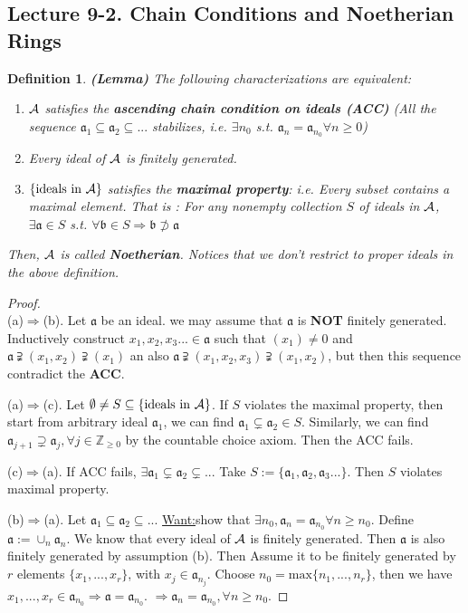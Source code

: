 \documentclass[11pt]{article}
\newtheorem{dfn}[thm]{Definition}
\newcommand{\intg}{\mathbb Z}
\newcommand{\sca}{{\mathfrak a}}
\newcommand{\scb}{{\mathfrak b}}
\newcommand{\cala}{{\cal A}}
\newcommand{\Lrta}{\Longrightarrow}
\begin{document}
\subsection{Lecture 9-2. Chain Conditions and Noetherian Rings}
\begin{dfn}
\textbf{(Lemma)} The following characterizations are equivalent:
\begin{enumerate}[label=(\alph*)]
\item $\cala$ satisfies the \textbf{ascending chain condition on ideals (ACC)} (All the sequence $\sca_1\subseteq \sca_2\subseteq ...$ stabilizes, i.e. $\exists n_0$ s.t. $\sca_n=\sca_{n_0} \forall n\geq 0$)
\item Every ideal of $\cala$ is finitely generated.
\item $\{\text{ideals in $\cala$}\}$ satisfies the \textbf{maximal property}: i.e. Every subset contains a maximal element. That is : For any nonempty collection $S$ of ideals in $\cala$, $\exists \sca\in S$ s.t. $\forall \scb\in S\Lrta \scb\not \supset \sca$
\end{enumerate}
Then, $\cala$ is called \textbf{Noetherian}. Notices that we don't restrict to proper ideals in the above definition.
\end{dfn}
\begin{proof}\ \\
(a)$\Lrta$(b). Let $\sca$ be an ideal. we may assume that $\sca$ is \textbf{NOT} finitely generated. Inductively construct $x_1, x_2,x_3...\in \sca$ such that $(x_1)\neq 0$ and $\sca\supsetneqq(x_1,x_2)\supsetneqq(x_1)$ an also $\sca\supsetneqq(x_1,x_2,x_3)\supsetneqq(x_1,x_2)$, but then this sequence contradict the \textbf{ACC}.

(a)$\Lrta$(c). Let $\emptyset \neq S\subseteq \{\text{ideals in }\cala\}$. If $S$ violates the maximal property, then start from arbitrary ideal $\sca_1$, we can find $\sca_1\subsetneq \sca_2\in S$. Similarly, we can find $\sca_{j+1}\supsetneq \sca_j,\forall j\in\intg_{\geq 0}$ by the countable choice axiom. Then the ACC fails.

(c)$\Lrta $(a). If ACC fails, $\exists \sca_1\subsetneq \sca_2\subsetneq ...$ Take $S:=\{\sca_1,\sca_2,\sca_3...\}$. Then $S$ violates maximal property.

(b)$\Lrta$(a). Let $\sca_1\subseteq\sca_2\subseteq ...$ \underline{Want:}show that $\exists n_0,\sca_n=\sca_{n_0}\forall n\geq n_0$.
Define $\sca:=\cup_n \sca_n$. We know that every ideal of $\cala$ is finitely generated. Then $\sca$ is also finitely generated by assumption (b). Then Assume it to be finitely generated by $r$ elements $\{x_1,...,x_r\}$, with $x_j\in\sca_{n_j}$. Choose $n_0=\text{max}\{n_1,...,n_r\}$, then we have $x_1,...,x_r\in \sca_{n_0}\Lrta \sca=\sca_{n_0}$. $\Lrta \sca_n=\sca_{n_0},\forall n\geq n_0$.
\end{proof}
\end{document}
